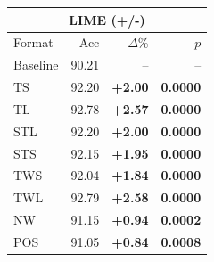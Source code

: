 \begin{tabular}{lrrr}
\toprule
\multicolumn{4}{c}{\textbf{LIME (+/-)}} \\
\midrule
Format & Acc & $\Delta$\% & $p$ \\
\midrule
Baseline & 90.21 & -- & -- \\
\midrule
TS & 92.20 & \textbf{+2.00} & \textbf{0.0000} \\
TL & 92.78 & \textbf{+2.57} & \textbf{0.0000} \\
STL & 92.20 & \textbf{+2.00} & \textbf{0.0000} \\
STS & 92.15 & \textbf{+1.95} & \textbf{0.0000} \\
TWS & 92.04 & \textbf{+1.84} & \textbf{0.0000} \\
TWL & 92.79 & \textbf{+2.58} & \textbf{0.0000} \\
NW & 91.15 & \textbf{+0.94} & \textbf{0.0002} \\
POS & 91.05 & \textbf{+0.84} & \textbf{0.0008} \\
\bottomrule
\end{tabular}
